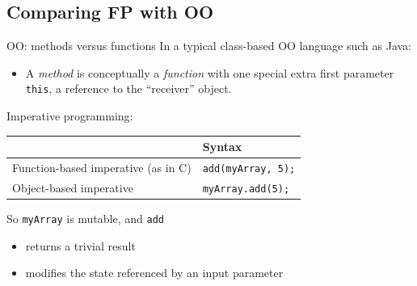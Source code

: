 \subsection{Comparing FP with OO}

\begin{frame}[fragile]{OO: methods versus functions}
  In a typical class-based OO language such as Java:
  \begin{itemize}
  \item A \emph{method} is conceptually a \emph{function} with one
    special extra first parameter \texttt{this}, a reference
    to the ``receiver'' object.
  \end{itemize}

  Imperative programming:
  \begin{table}
    \begin{tabular}{| l || l |}
      \toprule
      & Syntax \\
      \midrule
        Function-based imperative (as in C) & \texttt{add(myArray, 5);} \\
        Object-based imperative & \texttt{myArray.add(5);} \\
      \bottomrule
    \end{tabular}
  \end{table}

  So \texttt{myArray} is mutable, and \texttt{add}
  \begin{itemize}
  \item returns a trivial result
  \item modifies the state referenced by an input parameter
  \end{itemize}
\end{frame}

